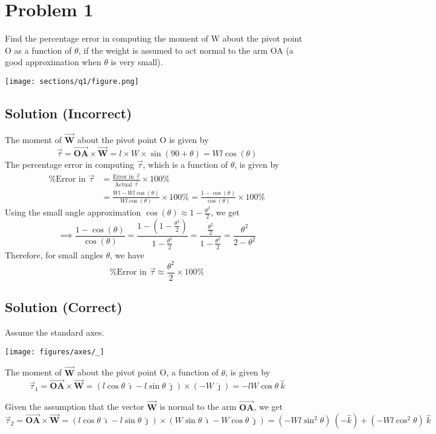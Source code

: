 \section*{Problem 1}

Find the percentage error in computing the moment of W about the pivot point O as a function of \( \theta \), if the weight is assumed to act normal to the arm OA (a good approximation when \( \theta \) is very small).

\begin{figure*}[h]
    \centering
    \texttt{[image: sections/q1/figure.png]}
\end{figure*}

\subsection*{Solution (Incorrect)}

The moment of \( \vec{\mathbf{W}} \) about the pivot point O is given by
\[
    \vec{\tau} = \vec{\mathbf{OA}} \times \vec{\mathbf{W}}
    = l \times W \times \sin(90 + \theta)
    = W l \cos(\theta)
\]
The percentage error in computing \( \vec{\tau} \), which is a function of \( \theta \),  is given by
\begin{align*}
    \text{\%Error in } \vec{\tau}
     & =
    \frac{\text{Error in }\vec{\tau}}{\text{Actual }\vec{\tau}} \times 100\% \\
     & = \frac{W l - W l \cos(\theta)}{W l \cos(\theta)} \times 100\%
    = \frac{1 - \cos(\theta)}{\cos(\theta)} \times 100\%
\end{align*}
Using the small angle approximation \( \cos(\theta) \approx 1 - \frac{\theta^2}{2} \), we get
\[
    \implies \frac{1 - \cos(\theta)}{\cos(\theta)}
    = \frac{1 - (1 - \frac{\theta^2}{2})}{1 - \frac{\theta^2}{2}}
    = \frac{\frac{\theta^2}{2}}{1 - \frac{\theta^2}{2}}
    = \frac{\theta^2}{2 - \theta^2}
\]
Therefore, for small angles \( \theta \), we have
\[
    \boxed{
        \text{\%Error in } \vec{\tau} \approx \frac{\theta^2}{2} \times 100\%
    }
\]

\subsection*{Solution (Correct)}

Assume the standard axes.
\vspace{-2em}
\begin{center}
    \texttt{[image: figures/axes/\_]}
\end{center}
\vspace{-1em}
The moment of \( \vec{\mathbf{W}} \) about the pivot point O, a function of \( \theta \), is given by
\[
    \vec{\tau}_1 = \vec{\mathbf{OA}} \times \vec{\mathbf{W}}
    = (l \cos \theta \ \hat{\imath} - l \sin \theta \ \hat{\jmath}) \times (- W \ \hat{\jmath})
    = -lW \cos \theta \ \hat{k}
\]

Given the assumption that the vector \( \vec{\mathbf{W}} \) is normal to the arm \( \vec{\mathbf{OA}} \), we get
\[
    \vec{\tau}_2 = \vec{\mathbf{OA}} \times \vec{\mathbf{W}}
    = (l \cos \theta \ \hat{\imath} - l \sin \theta \ \hat{\jmath}) \times (W \sin \theta \ \hat{\imath} - W \cos \theta \ \hat{\jmath})
    = (- Wl \sin^2 \theta) \ (- \hat{k}) + (-Wl \cos^2 \theta) \ \hat{k}
\]

